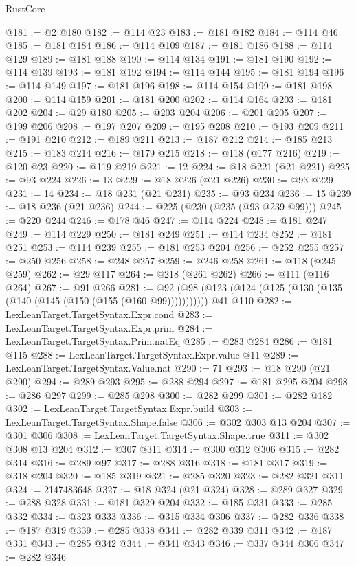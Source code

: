 \begin{lexlean}{RustCore}
\begin{coremodule}
@181 := @2 @180
@182 := @114 @23
@183 := @181 @182
@184 := @114 @46
@185 := @181 @184
@186 := @114 @109
@187 := @181 @186
@188 := @114 @129
@189 := @181 @188
@190 := @114 @134
@191 := @181 @190
@192 := @114 @139
@193 := @181 @192
@194 := @114 @144
@195 := @181 @194
@196 := @114 @149
@197 := @181 @196
@198 := @114 @154
@199 := @181 @198
@200 := @114 @159
@201 := @181 @200
@202 := @114 @164
@203 := @181 @202
@204 := @29 @180
@205 := @203 @204
@206 := @201 @205
@207 := @199 @206
@208 := @197 @207
@209 := @195 @208
@210 := @193 @209
@211 := @191 @210
@212 := @189 @211
@213 := @187 @212
@214 := @185 @213
@215 := @183 @214
@216 := @179 @215
@218 := @118 (@177 @216)
@219 := @120 @23
@220 := @119 @219
@221 := 12
@224 := @18 @221 (@21 @221)
@225 := @93 @224
@226 := 13
@229 := @18 @226 (@21 @226)
@230 := @93 @229
@231 := 14
@234 := @18 @231 (@21 @231)
@235 := @93 @234
@236 := 15
@239 := @18 @236 (@21 @236)
@244 := @225 (@230 (@235 (@93 @239 @99)))
@245 := @220 @244
@246 := @178 @46
@247 := @114 @224
@248 := @181 @247
@249 := @114 @229
@250 := @181 @249
@251 := @114 @234
@252 := @181 @251
@253 := @114 @239
@255 := @181 @253 @204
@256 := @252 @255
@257 := @250 @256
@258 := @248 @257
@259 := @246 @258
@261 := @118 (@245 @259)
@262 := @29 @117
@264 := @218 (@261 @262)
@266 := @111 (@116 @264)
@267 := @91 @266
@281 := @92 (@98 (@123 (@124 (@125 (@130 (@135 (@140 (@145 (@150 (@155 (@160 @99))))))))))) @41 @110
@282 := LexLeanTarget.TargetSyntax.Expr.cond
@283 := LexLeanTarget.TargetSyntax.Expr.prim
@284 := LexLeanTarget.TargetSyntax.Prim.natEq
@285 := @283 @284
@286 := @181 @115
@288 := LexLeanTarget.TargetSyntax.Expr.value @11
@289 := LexLeanTarget.TargetSyntax.Value.nat
@290 := 71
@293 := @18 @290 (@21 @290)
@294 := @289 @293
@295 := @288 @294
@297 := @181 @295 @204
@298 := @286 @297
@299 := @285 @298
@300 := @282 @299
@301 := @282 @182
@302 := LexLeanTarget.TargetSyntax.Expr.build
@303 := LexLeanTarget.TargetSyntax.Shape.false
@306 := @302 @303 @13 @204
@307 := @301 @306
@308 := LexLeanTarget.TargetSyntax.Shape.true
@311 := @302 @308 @13 @204
@312 := @307 @311
@314 := @300 @312 @306
@315 := @282 @314
@316 := @289 @97
@317 := @288 @316
@318 := @181 @317
@319 := @318 @204
@320 := @185 @319
@321 := @285 @320
@323 := @282 @321 @311
@324 := 2147483648
@327 := @18 @324 (@21 @324)
@328 := @289 @327
@329 := @288 @328
@331 := @181 @329 @204
@332 := @185 @331
@333 := @285 @332
@334 := @323 @333
@336 := @315 @334 @306
@337 := @282 @336
@338 := @187 @319
@339 := @285 @338
@341 := @282 @339 @311
@342 := @187 @331
@343 := @285 @342
@344 := @341 @343
@346 := @337 @344 @306
@347 := @282 @346

\end{coremodule}
\end{lexlean}
